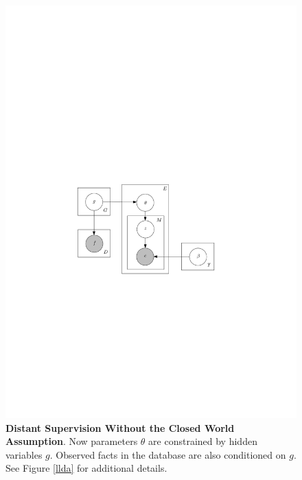 \documentclass[12pt]{article}
\begin{document}
\begin{figure}
  \centering
  \includegraphics{glda.pdf}
  \caption{{\bf Distant Supervision Without the Closed World Assumption}.  Now parameters $\theta$ are constrained by hidden variables $g$.  Observed facts in the database
    are also conditioned on $g$.  See Figure \ref{llda} for additional details.}
\end{figure}


\end{document}
